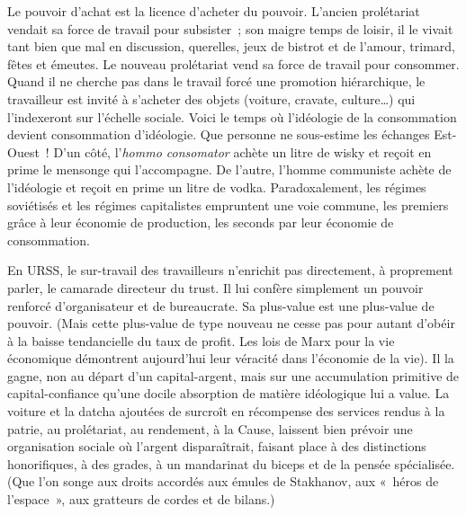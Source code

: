 \documentclass[french,twoside]{book} %
\begin{document}
Le pouvoir d’achat est la licence d’acheter du pouvoir. L’ancien prolétariat vendait sa force de travail pour subsister ; son maigre temps de loisir, il le vivait tant bien que mal en discussion, querelles, jeux de bistrot et de l’amour, trimard, fêtes et émeutes. Le nouveau prolétariat vend sa force de travail pour consommer. Quand il ne cherche pas dans le travail forcé une promotion hiérarchique, le travailleur est invité à s’acheter des objets (voiture, cravate, culture…) qui l’indexeront sur l’échelle sociale. Voici le temps où l’idéologie de la consommation devient consommation d’idéologie. Que personne ne sous-estime les échanges Est-Ouest ! D’un côté, l’\emph{hommo consomator} achète un litre de wisky et reçoit en prime le mensonge qui l’accompagne. De l’autre, l’homme communiste achète de l’idéologie et reçoit en prime un litre de vodka. Paradoxalement, les régimes soviétisés et les régimes capitalistes empruntent une voie commune, les premiers grâce à leur économie de production, les seconds par leur économie de consommation.\par
En URSS, le sur-travail des travailleurs n’enrichit pas directement, à proprement parler, le camarade directeur du trust. Il lui confère simplement un pouvoir renforcé d’organisateur et de bureaucrate. Sa plus-value est une plus-value de pouvoir. (Mais cette plus-value de type nouveau ne cesse pas pour autant d’obéir à la baisse tendancielle du taux de profit. Les lois de Marx pour la vie économique démontrent aujourd’hui leur véracité dans l’économie de la vie). Il la gagne, non au départ d’un capital-argent, mais sur une accumulation primitive de capital-confiance qu’une docile absorption de matière idéologique lui a value. La voiture et la datcha ajoutées de surcroît en récompense des services rendus à la patrie, au prolétariat, au rendement, à la Cause, laissent bien prévoir une organisation sociale où l’argent disparaîtrait, faisant place à des distinctions honorifiques, à des grades, à un mandarinat du biceps et de la pensée spécialisée. (Que l’on songe aux droits accordés aux émules de Stakhanov, aux « héros de l’espace », aux gratteurs de cordes et de bilans.)\par
\end{document}
